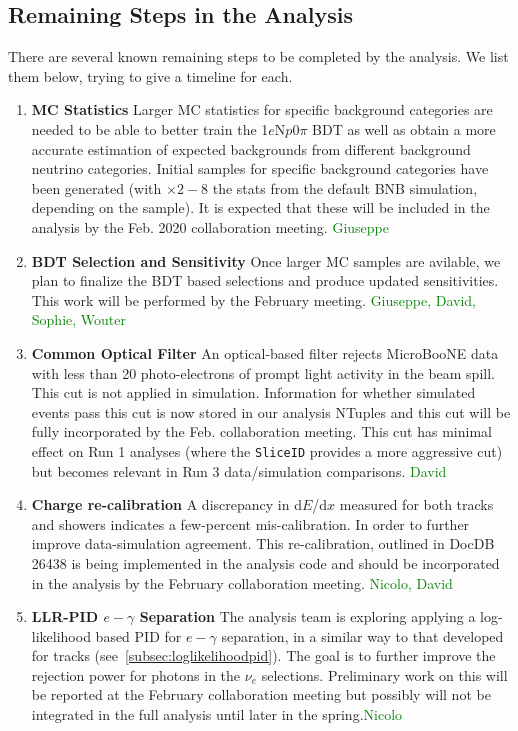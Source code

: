 \documentclass[a4paper]{article}
\newcommand{\npsel}{1$e$N$p$0$\pi$ }
\begin{document}
\subsection{Remaining Steps in the Analysis}
\par There are several known remaining steps to be completed by the analysis. We list them below, trying to give a timeline for each. 
\begin{enumerate}
    \item \textbf{MC Statistics} Larger MC statistics for specific background categories are needed to be able to better train the \npsel BDT as well as obtain a more accurate estimation of expected backgrounds from different background neutrino categories. Initial samples for specific background categories have been generated (with $\times2-8$ the stats from the default BNB simulation, depending on the sample). It is expected that these will be included in the analysis by the Feb. 2020 collaboration meeting. \textcolor{green}{Giuseppe}
    \item \textbf{BDT Selection and Sensitivity} Once larger MC samples are avilable, we plan to finalize the BDT based selections and produce updated sensitivities. This work will be performed by the February meeting. \textcolor{green}{Giuseppe, David, Sophie, Wouter}
    \item \textbf{Common Optical Filter} An optical-based filter rejects MicroBooNE data with less than 20 photo-electrons of prompt light activity in the beam spill. This cut is not applied in simulation. Information for whether simulated events pass this cut is now stored in our analysis NTuples and this cut will be fully incorporated by the Feb. collaboration meeting. This cut has minimal effect on Run 1 analyses (where the \texttt{SliceID} provides a more aggressive cut) but becomes relevant in Run 3 data/simulation comparisons. \textcolor{green}{David}
    \item \textbf{Charge re-calibration} A discrepancy in d$E$/d$x$ measured for both tracks and showers indicates a few-percent mis-calibration. In order to further improve data-simulation agreement. This re-calibration, outlined in DocDB 26438 is being implemented in the analysis code and should be incorporated in the analysis by the February collaboration meeting. \textcolor{green}{Nicolo, David}
    \item \textbf{LLR-PID $e-\gamma$ Separation} The analysis team is exploring applying a log-likelihood based PID for $e-\gamma$ separation, in a similar way to that developed for tracks (see~\ref{subsec:loglikelihoodpid}). The goal is to further improve the rejection power for photons in the $\nu_e$ selections. Preliminary work on this will be reported at the February collaboration meeting but possibly will not be integrated in the full analysis until later in the spring.\textcolor{green}{Nicolo}

\end{enumerate}
\end{document}
